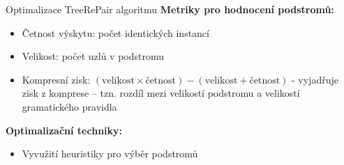 \documentclass[lualatex,hyperref={pdfencoding=auto}]{beamer}
\begin{document}

\begin{frame}{Optimalizace TreeRePair algoritmu}
      \textbf{Metriky pro hodnocení podstromů:}
      \begin{itemize}
        \item Četnost výskytu: počet identických instancí
        \item Velikost: počet uzlů v podstromu
        \item Kompresní zisk: $(\text{velikost} \times \text{četnost}) - (\text{velikost} + \text{četnost})$ - vyjadřuje zisk z komprese -- tzn. rozdíl mezi velikostí podstromu a velikostí gramatického pravidla
      \end{itemize}
      
      \textbf{Optimalizační techniky:}
      \begin{itemize}
        \item Vyvužití heuristiky pro výběr podstromů
      \end{itemize}
\end{frame}
\end{document}
